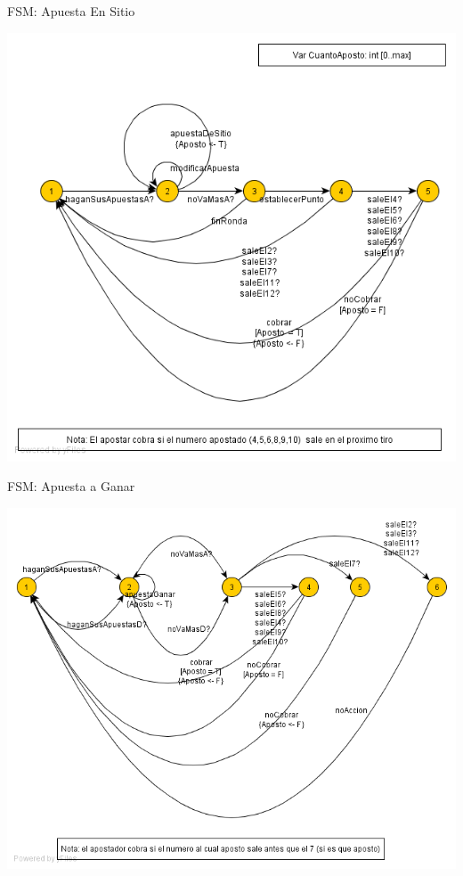{\large FSM: Apuesta En Sitio}
\begin{center}
\includegraphics[scale=0.5]{img/apuestaEnSitio.png}
\end{center}

\newpage
{\large FSM: Apuesta a Ganar}
\begin{center}
\includegraphics[scale=0.5]{img/apuestaAGanar.png}
\end{center}


